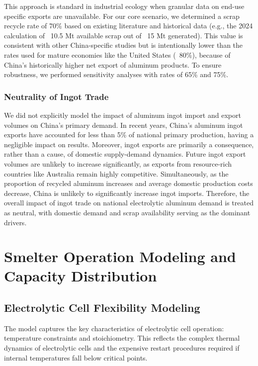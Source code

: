 \documentclass[preprint,12pt]{elsarticle}
\begin{document}
This approach is standard in industrial ecology when granular data on end-use specific exports are unavailable. For our core scenario, we determined a scrap recycle rate of 70\% based on existing literature and historical data (e.g., the 2024 calculation of ~10.5 Mt available scrap out of ~15 Mt generated). This value is consistent with other China-specific studies but is intentionally lower than the rates used for mature economies like the United States (~80\%), because of China's historically higher net export of aluminum products. To ensure robustness, we performed sensitivity analyses with rates of 65\% and 75\%.


\subsubsection{Neutrality of Ingot Trade}
We did not explicitly model the impact of aluminum ingot import and export volumes on China's primary demand. In recent years, China's aluminum ingot exports have accounted for less than 5\% of national primary production, having a negligible impact on results. Moreover, ingot exports are primarily a consequence, rather than a cause, of domestic supply-demand dynamics. Future ingot export volumes are unlikely to increase significantly, as exports from resource-rich countries like Australia remain highly competitive. Simultaneously, as the proportion of recycled aluminum increases and average domestic production costs decrease, China is unlikely to significantly increase ingot imports. Therefore, the overall impact of ingot trade on national electrolytic aluminum demand is treated as neutral, with domestic demand and scrap availability serving as the dominant drivers.

\newpage
\section{Smelter Operation Modeling and Capacity Distribution}


\subsection{Electrolytic Cell Flexibility Modeling}

The model captures the key characteristics of electrolytic cell operation: temperature constraints and stoichiometry. This reflects the complex thermal dynamics of electrolytic cells and the expensive restart procedures required if internal temperatures fall below critical points.
\end{document}
